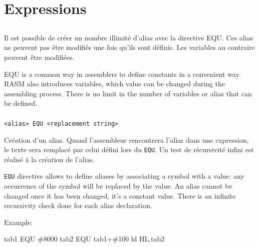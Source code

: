 \section{Expressions}

\subsection{}
\begin{xfr}
Il est possible de créer un nombre illimité d’alias avec la directive EQU.
Ces alias ne peuvent pas être modifiés une fois qu'ils sont définis.
Les variables au contraire peuvent être modifiées.
\end{xfr}

\begin{xen}
EQU is a common way in assemblers to define constants in a convenient way.
RASM also introduces variables, which value can be changed during the assembling process.
There is no limit in the number of variables or alias that can be defined.
\end{xen}

\subsubsection{}
\begin{verbatim}
<alias> EQU <replacement string>
\end{verbatim}

\begin{xfr}
Création d'un alias. Quand l'assembleur rencontrera l'alias dans une expression, le texte sera remplacé par celui défini lors du \texttt{EQU}.
Un test de récursivité infini est réalisé à la création de l'alias.
\end{xfr}

\begin{xen}
\texttt{EQU} directive allows to define aliases by associating a symbol with a value: any occurrence of the symbol will be replaced by the value. An alias cannot be changed once it has been changed, it's a constant value.
There is an infinite recursivity check done for each alias declaration.
\end{xen}

Example:
\begin{code}
tab1 EQU \#8000
tab2 EQU tab1+\#100
ld HL,tab2
\end{code}

